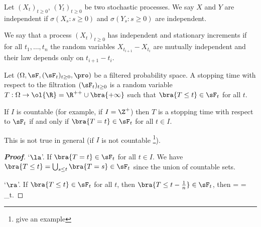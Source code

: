 \begin{definition}\label{def:independence_stochastic_process}
Let $(X_t)_{t\geq 0}$, $(Y_t)_{t\geq 0}$ be two stochastic processes. We say $X$ and $Y$ are independent if $\sigma(X_s: s \geq 0)$ and $\sigma(Y_s: s \geq 0)$ are independent.
\end{definition}

\begin{definition}\label{def:independent_stationary_increments_stochastic_process}
We say that a process $(X_t)_{t \geq 0}$ has independent and stationary increments if for all $t_1,\dots, t_n$ the random variables $X_{t_{i+1}} -X_{t_i}$ are mutually independent and their law depends only on $t_{i+1} - t_i$.
\end{definition}

\begin{definition}\label{def:stopping_time_continuous}
Let $(\Omega,\sF, (\sF_t)_{t\geq 0},\pro)$ be a filtered probability space. A stopping time with respect to the filtration $(\sF_t)_{t\geq 0}$ is a random variable $T:\Omega \to \ol{\R} = \R^{++}\cup \bra{+\infty}$ such that $\bra{T \leq t} \in \sF_t$ for all $t$.
\end{definition}


\begin{proposition}
If $I$ is countable (for example, if $I = \Z^+$) then $T$ is a stopping time with respect to $\sF_t$ if and only if $\bra{T = t}\in \sF_t$ for all $t \in I$.
\end{proposition}

\begin{remark}
This is not true in general (if $I$ is not countable \footnote{give an example}).
\end{remark}

\begin{proof}[\bf Proof]
`$\la$'. If $\bra{T=t}\in \sF_t$ for all $t\in I$. We have $\bra{T\leq t} = \bigcup_{s\leq t} \bra{T=s} \in \sF_t$ since the union of countable sets.

`$\ra$'. If $\bra{T\leq t}\in \sF_t$ for all $t$, then $\bra{T\leq t-\frac 1n} \in \sF_t$, then
\be
{} = \bs {} =  \bs {} \in \sF_t.
\ee
\end{proof}

